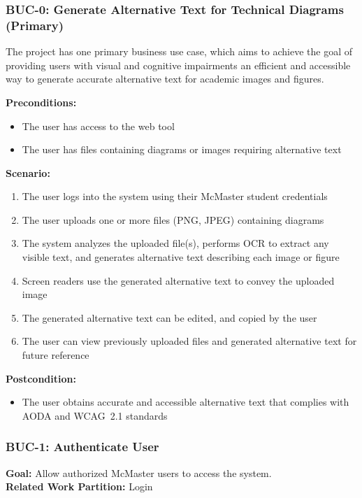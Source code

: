 \documentclass[12pt]{article}
\begin{document}
\subsubsection*{BUC-0: Generate Alternative Text for Technical Diagrams (Primary)}

The project has one primary business use case, which aims to achieve
the goal of providing users with visual and cognitive impairments an
efficient and accessible way to generate accurate alternative text
for academic images and figures.

\textbf{Preconditions:}
\begin{itemize}
  \item The user has access to the web tool
  \item The user has files containing diagrams or images requiring
  alternative text
\end{itemize}

\textbf{Scenario:}
\begin{enumerate}
  \item The user logs into the system using their McMaster student credentials
  \item The user uploads one or more files (PNG, JPEG) containing diagrams
  \item The system analyzes the uploaded file(s), performs OCR to
  extract any visible text, and generates alternative text describing
  each image or figure
  \item Screen readers use the generated alternative text to convey
  the uploaded image
  \item The generated alternative text can be edited, and copied by the user
  \item The user can view previously uploaded files and generated
  alternative text for future reference
\end{enumerate}

\textbf{Postcondition:}
\begin{itemize}
  \item The user obtains accurate and accessible alternative text
  that complies with AODA and WCAG~2.1 standards
\end{itemize}

\subsubsection*{BUC-1: Authenticate User}

\textbf{Goal:} Allow authorized McMaster users to access the system.\\
\textbf{Related Work Partition:} Login
\end{document}
